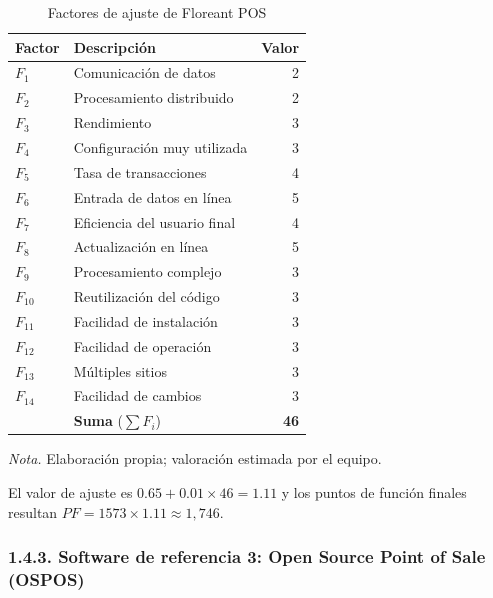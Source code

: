 \begin{table}[H]
\caption{Factores de ajuste de Floreant POS}
\label{tab:ref2_fi}
\begin{threeparttable}
\begin{tabular}{>{\raggedright\arraybackslash}p{1.4cm} >{\raggedright\arraybackslash}p{7cm} r}
\toprule
Factor & Descripción & Valor \\
\midrule
$F_{1}$ & Comunicación de datos & 2 \\
$F_{2}$ & Procesamiento distribuido & 2 \\
$F_{3}$ & Rendimiento & 3 \\
$F_{4}$ & Configuración muy utilizada & 3 \\
$F_{5}$ & Tasa de transacciones & 4 \\
$F_{6}$ & Entrada de datos en línea & 5 \\
$F_{7}$ & Eficiencia del usuario final & 4 \\
$F_{8}$ & Actualización en línea & 5 \\
$F_{9}$ & Procesamiento complejo & 3 \\
$F_{10}$ & Reutilización del código & 3 \\
$F_{11}$ & Facilidad de instalación & 3 \\
$F_{12}$ & Facilidad de operación & 3 \\
$F_{13}$ & Múltiples sitios & 3 \\
$F_{14}$ & Facilidad de cambios & 3 \\
 & \textbf{Suma} ($\sum F_i$) & \textbf{46} \\
\bottomrule
\end{tabular}
\begin{tablenotes}
\item \textit{Nota.} Elaboración propia; valoración estimada por el equipo.
\end{tablenotes}
\end{threeparttable}
\end{table}

El valor de ajuste es $0.65 + 0.01 \times 46 = 1.11$ y los puntos de función finales resultan $PF = 1573 \times 1.11 \approx 1,746$.

\subsubsection{1.4.3. Software de referencia 3: Open Source Point of Sale (OSPOS)}

